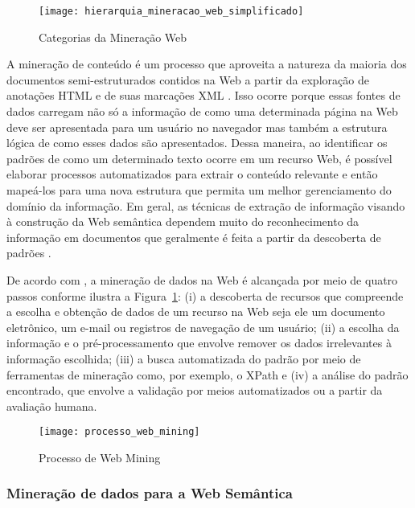 \begin{figure}[!ht]
  \centering
  \texttt{[image: hierarquia\_mineracao\_web\_simplificado]} 
  \caption{Categorias da Mineração Web}
\end{figure}
  \label{fig:hierarquia_mineracao_Web} 

A mineração de conteúdo é um processo que aproveita a natureza da maioria dos documentos semi-estruturados contidos na Web a partir da exploração de anotações HTML e de suas marcações XML \citep{Stumme2006}. Isso ocorre porque essas fontes de dados carregam não só a informação de como uma determinada página na Web deve ser apresentada para um usuário no navegador mas também a estrutura lógica de como esses dados são apresentados. Dessa maneira, ao identificar os padrões de como um determinado texto ocorre em um recurso Web, é possível elaborar processos automatizados para extrair o conteúdo relevante e então mapeá-los para uma nova estrutura que permita um melhor gerenciamento do domínio da informação. Em geral, as técnicas de extração de informação visando à construção da Web semântica dependem muito do reconhecimento da informação em documentos que geralmente é feita a partir da descoberta de padrões \citep{Berendt2004}.

De acordo com \citet{Zhang2011}, a mineração de dados na Web é alcançada por meio de quatro passos conforme ilustra a Figura~\ref{fig:processo_Web_mining}: (i) a descoberta de recursos que compreende a escolha e obtenção de dados de um recurso na Web seja ele um documento eletrônico, um e-mail ou registros de navegação de um usuário; (ii) a escolha da informação e o pré-processamento que envolve remover os dados irrelevantes à informação escolhida; (iii) a busca automatizada do padrão por meio de ferramentas de mineração como, por exemplo, o XPath e (iv) a análise do padrão encontrado, que envolve a validação por meios automatizados ou a partir da avaliação humana.

\begin{figure}[!ht]
  \centering
  \texttt{[image: processo\_web\_mining]} 
  \caption{Processo de Web Mining \citep{Zhang2011}}
  \label{fig:processo_Web_mining} 
\end{figure}

\subsubsection{Mineração de dados para a Web Semântica}
\label{sec:mineracao_Web_semantica}

